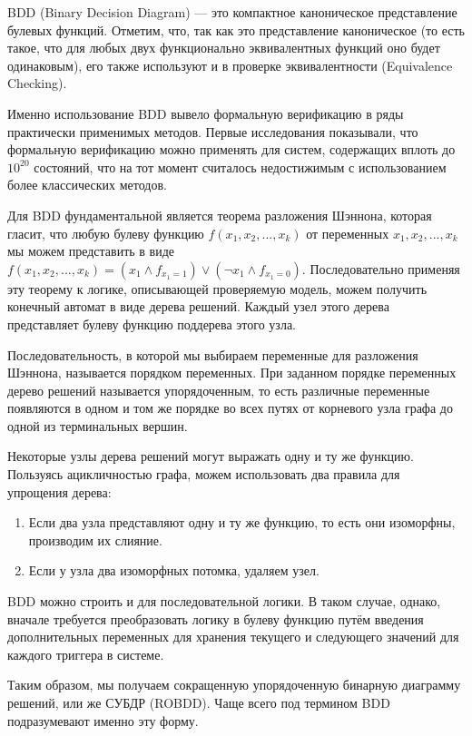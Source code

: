 \tab BDD (Binary Decision Diagram) --- это компактное каноническое представление булевых функций. Отметим, что, так как это представление каноническое (то есть такое, что для любых двух функционально эквивалентных функций оно будет одинаковым), его также используют и в проверке эквивалентности (Equivalence Checking).

Именно использование BDD вывело формальную верификацию в ряды практически применимых методов. Первые исследования показывали, что формальную верификацию можно применять для систем, содержащих вплоть до $10^{20}$ состояний\cite{states_and_beyond}, что на тот момент считалось недостижимым с использованием более классических методов. 

Для BDD фундаментальной является теорема разложения Шэннона, которая гласит, что любую булеву функцию $f(x_1, x_2, ..., x_k)$ от переменных $x_1, x_2, ..., x_k$ мы можем представить в виде $f(x_1, x_2, ..., x_k) = (x_1 \land f_{x_1=1}) \lor (\neg x_1 \land f_{x_1=0})$. Последовательно применяя эту теорему к логике, описывающей проверяемую модель, можем получить конечный автомат в виде дерева решений. Каждый узел этого дерева представляет булеву функцию поддерева этого узла. 

Последовательность, в которой мы выбираем переменные для разложения Шэннона, называется порядком переменных. При заданном порядке переменных дерево решений называется упорядоченным, то есть различные переменные появляются в одном и том же порядке во всех путях от корневого узла графа до одной из терминальных вершин. 

Некоторые узлы дерева решений могут выражать одну и ту же функцию. Пользуясь ацикличностью графа, можем использовать два правила для упрощения дерева:
\begin{enumerate}
    \item Если два узла представляют одну и ту же функцию, то есть они изоморфны, производим их слияние.
    \item Если у узла два изоморфных потомка, удаляем узел.
\end{enumerate} 

BDD можно строить и для последовательной логики. В таком случае, однако, вначале требуется преобразовать логику в булеву функцию путём введения дополнительных переменных для хранения текущего и следующего значений для каждого триггера в системе. 

Таким образом, мы получаем сокращенную упорядоченную бинарную диаграмму решений, или же СУБДР (ROBDD). Чаще всего под термином BDD подразумевают именно эту форму. 

